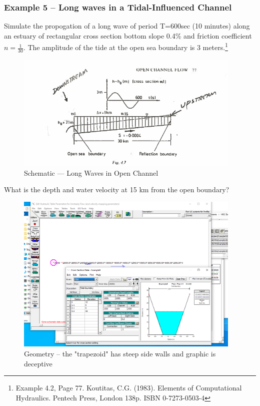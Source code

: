 \subsubsection{Example 5 -- Long waves in a Tidal-Influenced Channel}
Simulate the propogation of a long wave of period T=600sec (10 minutes) along an estuary of rectangular cross section bottom slope 0.4\% and friction coefficient $n=\frac{1}{30}$.
The amplitude of the tide at the open sea boundary is 3 meters.\footnote{Example 4.2, Page 77. Koutitas, C.G. (1983). Elements of Computational Hydraulics. Pentech Press, London 138p. ISBN 0-7273-0503-4 }

\begin{figure}[h!] %
   \centering
   \includegraphics[width=4.25in]{ex5scheme.png} 
   \caption{Schematic --- Long Waves in Open Channel}
   \label{fig:ex5scheme}
\end{figure}

What is the depth and water velocity at 15 km from the open boundary?

\begin{figure}[h!] %
   \centering
   \includegraphics[width=4.25in]{ex5geom.png} 
   \caption{Geometry -- the "trapezoid" has steep side walls and graphic is deceptive}
   \label{fig:ex5geom}
\end{figure}

